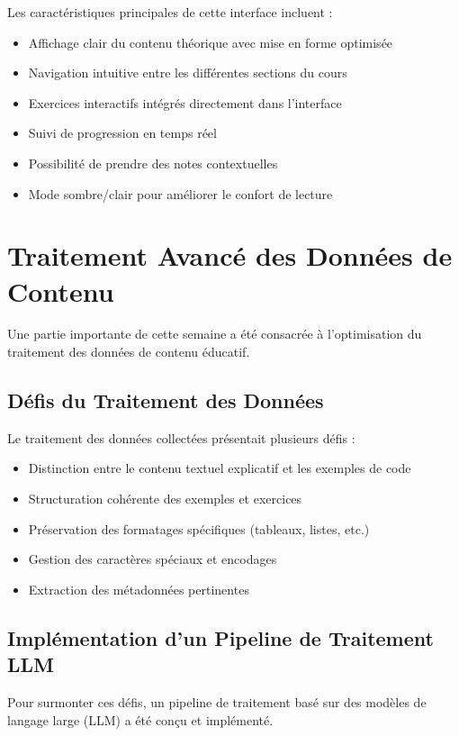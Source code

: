 Les caractéristiques principales de cette interface incluent :
\begin{itemize}
  \item Affichage clair du contenu théorique avec mise en forme optimisée
  \item Navigation intuitive entre les différentes sections du cours
  \item Exercices interactifs intégrés directement dans l'interface
  \item Suivi de progression en temps réel
  \item Possibilité de prendre des notes contextuelles
  \item Mode sombre/clair pour améliorer le confort de lecture
\end{itemize}

\section{Traitement Avancé des Données de Contenu}

Une partie importante de cette semaine a été consacrée à l'optimisation du traitement des données de contenu éducatif.

\subsection{Défis du Traitement des Données}

Le traitement des données collectées présentait plusieurs défis :
\begin{itemize}
  \item Distinction entre le contenu textuel explicatif et les exemples de code
  \item Structuration cohérente des exemples et exercices
  \item Préservation des formatages spécifiques (tableaux, listes, etc.)
  \item Gestion des caractères spéciaux et encodages
  \item Extraction des métadonnées pertinentes
\end{itemize}

\subsection{Implémentation d'un Pipeline de Traitement LLM}

Pour surmonter ces défis, un pipeline de traitement basé sur des modèles de langage large (LLM) a été conçu et implémenté.

